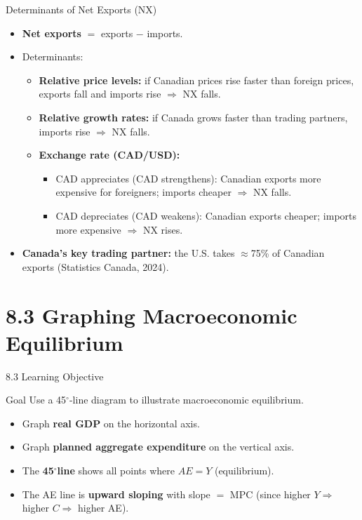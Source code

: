 \documentclass[aspectratio=169]{beamer}
\newcommand{\degree}{$^\circ$}
\begin{document}
\begin{frame}{Determinants of Net Exports (NX)}
\transfade
\begin{itemize}
  \item \textbf{Net exports} $= $ exports $-$ imports.
  \item Determinants:
  \begin{itemize}
    \item \textbf{Relative price levels:} if Canadian prices rise faster than foreign prices, exports fall and imports rise $\Rightarrow$ NX falls.
    \item \textbf{Relative growth rates:} if Canada grows faster than trading partners, imports rise $\Rightarrow$ NX falls.
    \item \textbf{Exchange rate (CAD/USD):}
    \begin{itemize}
      \item \alert{CAD appreciates} (CAD strengthens): Canadian exports more expensive for foreigners; imports cheaper $\Rightarrow$ NX falls.
      \item \alert{CAD depreciates} (CAD weakens): Canadian exports cheaper; imports more expensive $\Rightarrow$ NX rises.
    \end{itemize}
  \end{itemize}
  \item \textbf{Canada's key trading partner:} the U.S. takes $\approx$75\% of Canadian exports (Statistics Canada, 2024).
\end{itemize}
\end{frame}

\section{8.3 Graphing Macroeconomic Equilibrium}

\begin{frame}{8.3 Learning Objective}
\transfade
\begin{block}{Goal}
Use a 45\degree-line diagram to illustrate macroeconomic equilibrium.
\end{block}
\begin{itemize}
  \item Graph \textbf{real GDP} on the horizontal axis.
  \item Graph \textbf{planned aggregate expenditure} on the vertical axis.
  \item The \textbf{45\degree line} shows all points where $AE = Y$ (equilibrium).
  \item The AE line is \textbf{upward sloping} with slope $= $ MPC (since higher $Y \Rightarrow$ higher $C \Rightarrow$ higher AE).
\end{itemize}
\end{frame}
\end{document}
